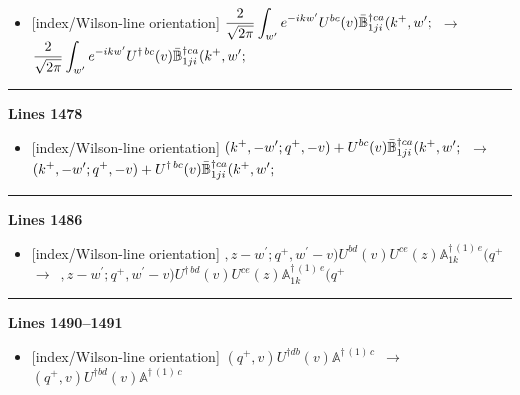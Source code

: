 \documentclass[10pt]{article}
\def\mf#1{\mathbb{#1}}
\begin{document}
\begin{itemize}[leftmargin=2.2em,itemsep=1pt,topsep=2pt]
\item[\textbf{l.1469}] \textsf{\small [index/Wilson-line orientation]} $\displaystyle \frac{2}{\sqrt{2\pi}}\int_{w^{\prime}}e^{-i k w^\prime} U^{ bc}(v)\Bar{\mf{B}}^{\dagger ca}_{1ji}(k^{+},w^{\prime};$\ $\longrightarrow$\ $\displaystyle \frac{2}{\sqrt{2\pi}}\int_{w^{\prime}}e^{-i k w^\prime} U^{\dagger\, bc}(v)\Bar{\mf{B}}^{\dagger ca}_{1ji}(k^{+},w^{\prime};$
\end{itemize}
\noindent\rule{\linewidth}{0.3pt}\par\noindent\textbf{Lines 1478} \par
\begin{itemize}[leftmargin=2.2em,itemsep=1pt,topsep=2pt]
\item[\textbf{l.1478}] \textsf{\small [index/Wilson-line orientation]} $\displaystyle (k^{+},-w^{\prime};q^{+},-v)+U^{ bc}(v)\Bar{\mf{B}}^{\dagger ca}_{1ji}(k^{+},w^{\prime};$\ $\longrightarrow$\ $\displaystyle (k^{+},-w^{\prime};q^{+},-v)+U^{\dagger\, bc}(v)\Bar{\mf{B}}^{\dagger ca}_{1ji}(k^{+},w^{\prime};$
\end{itemize}
\noindent\rule{\linewidth}{0.3pt}\par\noindent\textbf{Lines 1486} \par
\begin{itemize}[leftmargin=2.2em,itemsep=1pt,topsep=2pt]
\item[\textbf{l.1486}] \textsf{\small [index/Wilson-line orientation]} $\displaystyle ,z-w^{\prime}; q^{+},w^{\prime}-v)U^{bd}(v)U^{ce}(z) \mf{A}^{\dagger\,(1)\,e}_{1k}(q^{+}$\ $\longrightarrow$\ $\displaystyle ,z-w^{\prime}; q^{+},w^{\prime}-v)U^{\dagger\, bd}(v)U^{ce}(z) \mf{A}^{\dagger\,(1)\,e}_{1k}(q^{+}$
\end{itemize}
\noindent\rule{\linewidth}{0.3pt}\par\noindent\textbf{Lines 1490--1491} \par
\begin{itemize}[leftmargin=2.2em,itemsep=1pt,topsep=2pt]
\item[\textbf{l.1490}] \textsf{\small [index/Wilson-line orientation]} $\displaystyle (q^{+},v)U^{\dagger db}(v) \mf{A}^{\dagger\,(1)\, c}$\ $\longrightarrow$\ $\displaystyle (q^{+},v)U^{\dagger bd}(v) \mf{A}^{\dagger\,(1)\, c}$
\end{itemize}
\end{document}
